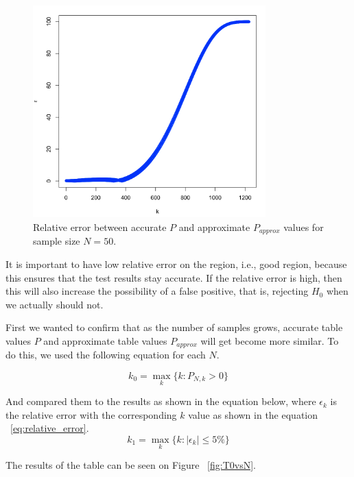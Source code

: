 \documentclass[12pt]{article}
\begin{document}
{\begin{figure}[H]
  \centering
  \includegraphics[width=0.8\textwidth]{approximate_accurate_epsilon}
  \caption{Relative error between accurate $P$ and approximate $P_{approx}$ values for sample size $N=50$.}
  \label{fig:epsilon_difference}
\end{figure}

It is important to have low relative error on the region, i.e., good region, because this ensures that the test results stay accurate. If the relative error is high, then this will also increase the possibility of a false positive, that is, rejecting $H_0$ when we actually should not.

First we wanted to confirm that as the number of samples grows, accurate table values $P$ and approximate table values $P_{approx}$ will get become more similar. To do this, we used the following equation for each $N$.

\begin{equation}
  k_0 = \max_k \{ k: P_{N, k} > 0 \}
\end{equation}

And compared them to the results as shown in the equation below, where $\epsilon_k$ is the relative error with the corresponding $k$ value as shown in the equation ~\eqref{eq:relative_error}.
\begin{equation}
  k_1 = \max_k \{ k: |\epsilon_k| \leq 5\% \}
\end{equation}

The results of the table can be seen on Figure ~\ref{fig:T0vsN}.

}
\end{document}
